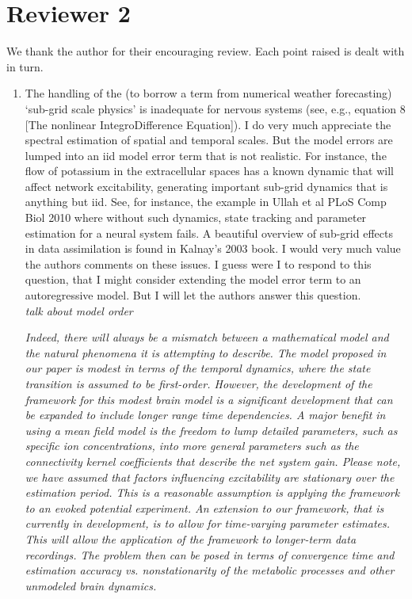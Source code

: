 \documentclass{article}
\begin{document}
    \section{Reviewer 2}
    
    We thank the author for their encouraging review. Each point raised is dealt with in turn.

\begin{enumerate}
    \item The handling of the (to borrow a term from numerical weather forecasting) `sub-grid scale physics' is inadequate for nervous systems (see, e.g., equation 8 [The nonlinear IntegroDifference Equation]). I do very much appreciate the spectral estimation of spatial and temporal scales. But the model errors are lumped into an iid model error term that is not realistic. For instance, the flow of potassium in the extracellular spaces has a known dynamic that will affect network excitability, generating important sub-grid dynamics that is anything but iid. See, for instance, the example in Ullah et al PLoS Comp Biol 2010 where without such dynamics, state tracking and parameter estimation for a neural system fails. A beautiful overview of sub-grid effects in data assimilation is found in Kalnay's 2003 book. I would very much value the authors comments on these issues. I guess were I to respond to this question, that I might consider extending the model error term to an autoregressive model. But I will let the authors answer this question.\\

    \emph{talk about model order}

	\emph{Indeed, there will always be a mismatch between a mathematical model and the natural phenomena it is attempting to describe. The model proposed in our paper is modest in terms of the temporal dynamics, where the state transition is assumed to be first-order. However, the development of the framework for this modest brain model is a significant development that can be expanded to include longer range time dependencies. A major benefit in using a mean field model is the freedom to lump detailed parameters, such as specific ion concentrations, into more general parameters such as the connectivity kernel coefficients that describe the net system gain. Please note, we have assumed that factors influencing excitability are stationary over the estimation period. This is a reasonable assumption is applying the framework to an evoked potential experiment. An extension to our framework, that is currently in development, is to allow for time-varying parameter estimates. This will allow the application of the framework to longer-term data recordings. The problem then can be posed in terms of convergence time and estimation accuracy vs. nonstationarity of the metabolic processes and other unmodeled brain dynamics.}
	

\end{enumerate}
\end{document}
